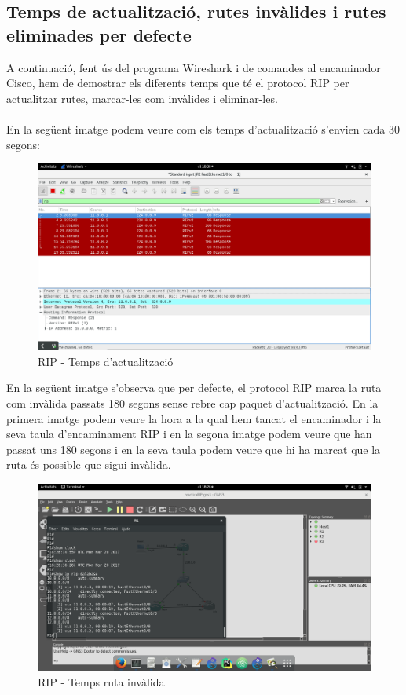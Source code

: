 \documentclass[10pt]{article}
\begin{document}
\subsection{Temps de actualització, rutes invàlides i rutes eliminades per defecte}
A continuació, fent ús del programa Wireshark i de comandes al encaminador Cisco, hem de demostrar els diferents temps que té el protocol RIP per actualitzar rutes, marcar-les com invàlides i eliminar-les.
\\\\
En la següent imatge podem veure com els temps d'actualització s'envien cada 30 segons:
\begin{figure}[H]
\begin{center}
\includegraphics[scale=0.3]{Images/RIP-update.png}
\caption{RIP - Temps d'actualització}
\end{center}
\end{figure}
En la següent imatge s'observa que per defecte, el protocol RIP marca la ruta com invàlida passats 180 segons sense rebre cap paquet d'actualització. En la primera imatge podem veure la hora a la qual hem tancat el encaminador i la seva taula d'encaminament RIP i en la segona imatge podem veure que han passat uns 180 segons i en la seva taula podem veure que hi ha marcat que la ruta és possible que sigui invàlida.
\begin{figure}[H]
\begin{center}
\includegraphics[scale=0.3]{Images/RIP-invalid1.png}
\caption{RIP - Temps ruta invàlida}
\end{center}
\end{figure}
\end{document}
